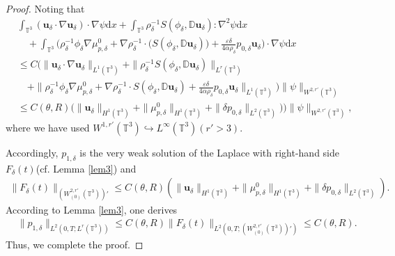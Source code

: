 \documentclass[reqno,a4paper,11pt]{amsart}
\theoremstyle{plain}
\numberwithin{equation}{section}
\renewcommand{\d}{\mathrm{d}}
\newcommand{\dx}{\d x}
\begin{document}
\begin{proof}
	Noting that
	\begin{align*}
		&\int_{\mathbb{T}^{3}}(\mathbf{u}_{\delta}\cdot\nabla
		\mathbf{u}_{\delta})\cdot\nabla\psi  \dx+\int_{\mathbb{T}^{3}}\rho_{\delta}^{-1}S(\phi_{\delta},\mathbb{ D}\mathbf{u}_{\delta}):\nabla^{2}\psi  \dx
		\\&\quad+\int_{\mathbb{T}^{3}}\big(\rho_{\delta}^{-1}\phi_{\delta} \nabla \mu_{p,\delta}^{0}+\nabla\rho_{\delta}^{-1}\cdot\big(S(\phi_{\delta},\mathbb{ D}\mathbf{u}_{\delta})\big)+\frac{\varepsilon\delta}{4\alpha \rho_{\delta}}  p_{0,\delta} \mathbf{u}_{\delta}\big)\cdot\nabla\psi  \dx\\ &\leq C\bigg(
		\|\mathbf{u}_{\delta}\cdot\nabla
		\mathbf{u}_{\delta}\|_{L^{1}(\mathbb{T}^{3})}+\|\rho_{\delta}^{-1}S(\phi_{\delta},\mathbb{ D}\mathbf{u}_{\delta})\|_{L^{r}(\mathbb{T}^{3})}
		\\&\quad+\|\rho_{\delta}^{-1}\phi_{\delta} \nabla \mu_{p,\delta}^{0}+\nabla\rho_{\delta}^{-1}\cdot S(\phi_{\delta},\mathbb{ D}\mathbf{u}_{\delta})+\frac{\varepsilon\delta}{4\alpha\rho_{\delta}}  p_{0,\delta} \mathbf{u}_{\delta}
		\|_{L^{1}(\mathbb{T}^{3})}\bigg)\|\psi\|_{W^{2,r'}(\mathbb{T}^{3})}
		\\&\leq C(\theta,R)\bigg(\|\mathbf{u}_{\delta}\|_{H^{1}(\mathbb{T}^{3})}+\|\mu_{p,\delta}^{0}\|_{H^{1}(\mathbb{T}^{3})}+\| \delta p_{0,\delta}\|_{L^{2}(\mathbb{T}^{3})})\bigg)\|\psi\|_{W^{2,r'}(\mathbb{T}^{3})},
	\end{align*}
	where we have used $W^{1,r'}(\mathbb{T}^{3})\hookrightarrow L^{\infty}(\mathbb{T}^{3})(r'>3)$.
	
	Accordingly,  $p_{1,\delta}$ is the very weak  solution of the Laplace with right-hand side $F_{\delta}(t)$(cf. Lemma \ref{lem3}) and
	\begin{align*}
		\|F_{\delta}(t)\|_{(W_{(0)}^{2,r'}(\mathbb{T}^{3}))'}\leq C(\theta,R)(\|\mathbf{u}_{\delta}\|_{H^{1}(\mathbb{T}^{3})}+\|\mu_{p,\delta}^{0}\|_{H^{1}(\mathbb{T}^{3})}+\| \delta p_{0,\delta}\|_{L^{2}(\mathbb{T}^{3})}).
	\end{align*}
	According to Lemma \ref{lem3}, one derives
	\begin{align*}
		&\|p_{1,\delta}\|_{L^{2}(0,T;L^{r}(\mathbb{T}^{3}))}\leq C(\theta,R)\|F_{\delta}(t)\|_{L^{2}(0,T;(W_{(0)}^{2,r'}(\mathbb{T}^{3}))')}\leq C(\theta,R).
	\end{align*}
	Thus, we complete the proof.
\end{proof}
\end{document}
